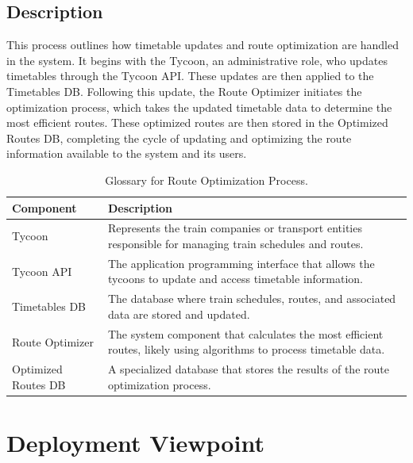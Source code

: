 \subsection*{Description}
This process outlines how timetable updates and route optimization are handled in the system. It begins with the Tycoon, an administrative role, who updates timetables through the Tycoon API. These updates are then applied to the Timetables DB. Following this update, the Route Optimizer initiates the optimization process, which takes the updated timetable data to determine the most efficient routes. These optimized routes are then stored in the Optimized Routes DB, completing the cycle of updating and optimizing the route information available to the system and its users.

\begin{table}[H]
    \centering
    \caption{Glossary for Route Optimization Process.}
    \label{tab:route_optimization_glossary}
    \begin{tabularx}{\textwidth}{@{}lX@{}} %
    \toprule
    \textbf{Component} & \textbf{Description} \\
    \midrule
    Tycoon & Represents the train companies or transport entities responsible for managing train schedules and routes. \\
    Tycoon API & The application programming interface that allows the tycoons to update and access timetable information. \\
    Timetables DB & The database where train schedules, routes, and associated data are stored and updated. \\
    Route Optimizer & The system component that calculates the most efficient routes, likely using algorithms to process timetable data. \\
    Optimized Routes DB & A specialized database that stores the results of the route optimization process. \\
    \bottomrule
    \end{tabularx}
\end{table}

\section{Deployment Viewpoint}

